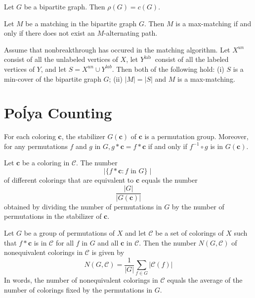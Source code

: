 \begin{theorem}
  \label{thm:13.2.5}
  Let $G$ be a bipartite graph. Then $\rho(G) =c(G)$.
\end{theorem}

\begin{theorem}
  \label{thm:13.3.1}
  Let $M$ be a matching in the bipartite graph $G$. Then $M$ is a max-matching if and only if there does not exist an $M$-alternating path.
\end{theorem}

\begin{theorem}
  \label{thm:13.3.2}
  Assume that nonbreakthrough has occured in the matching algorithm. Let $X^{u n}$ consist of all the unlabeled vertices of $X$, let $Y^{\text {lab }}$ consist of all the labeled vertices of $Y$, and let $S=X^{u n} \cup Y^{l a b}$. Then both of the following hold:
  (i) $S$ is a min-cover of the bipartite graph $G$;
  (ii) $|M|=|S|$ and $M$ is a max-matching.
\end{theorem}

\chapter{Po\'lya Counting}

\begin{theorem}
  \label{thm:14.2.1}
  For each coloring $\mathbf{c}$, the stabilizer $G(\mathbf{c})$ of $\mathbf{c}$ is a permutation group. Moreover, for any permutations $f$ and $g$ in $G, g * \mathbf{c}=f * \mathbf{c}$ if and only if $f^{-1} \circ g$ is in $G(\mathbf{c})$.
\end{theorem}

\begin{corollary}
  \label{cor:14.2.2}
  Let $\mathbf{c}$ be a coloring in $\mathcal{C}$. The number
  $$
  \mid\{f * \mathbf{c}: f \text { in } G\} \mid
  $$
  of different colorings that are equivalent to $\mathbf{c}$ equals the number
  $$
  \frac{|G|}{|G(\mathbf{c})|}
  $$
  obtained by dividing the number of permutations in $G$ by the number of permutations in the stabilizer of $\mathbf{c}$.
\end{corollary}

\begin{theorem}
  \label{thm:14.2.3}
  Let $G$ be a group of permutations of $X$ and let $\mathcal{C}$ be a set of colorings of $X$ such that $f * \mathbf{c}$ is in $\mathcal{C}$ for all $f$ in $G$ and all $\mathbf{c}$ in $\mathcal{C}$. Then the number $N(G, \mathcal{C})$ of nonequivalent colorings in $\mathcal{C}$ is given by
  \begin{equation}\label{14.7}
    N(G, \mathcal{C})=\frac{1}{|G|} \sum_{f \in G}|\mathcal{C}(f)|
  \end{equation}
  In words, the number of nonequivalent colorings in $\mathcal{C}$ equals the average of the number of colorings fixed by the permutations in $G$.   
\end{theorem}

